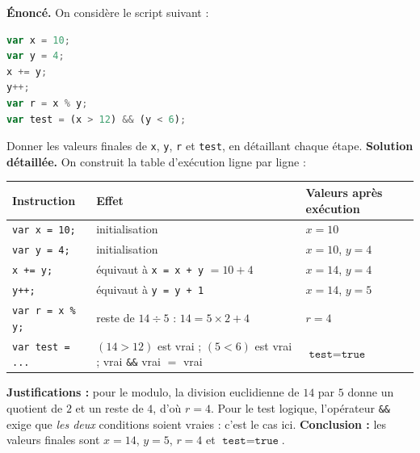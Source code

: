 \documentclass[11pt]{article}
\begin{document}
\begin{exoresolu}
\textbf{Énoncé.} On considère le script suivant :
\begin{lstlisting}[language=JavaScript]
var x = 10;
var y = 4;
x += y;
y++;
var r = x % y;
var test = (x > 12) && (y < 6);
\end{lstlisting}
Donner les valeurs finales de \texttt{x}, \texttt{y}, \texttt{r} et \texttt{test}, en détaillant chaque étape.
\tcblower
\textbf{Solution détaillée.} On construit la table d'exécution ligne par ligne :
\begin{center}
\begin{tabularx}{\linewidth}{|l|X|X|}\hline
\rowcolor{popblueL} \textbf{Instruction} & \textbf{Effet} & \textbf{Valeurs après exécution} \\ \hline
\texttt{var x = 10;} & initialisation & $x = 10$ \\ \hline
\texttt{var y = 4;} & initialisation & $x = 10$, $y = 4$ \\ \hline
\texttt{x += y;} & équivaut à \texttt{x = x + y} $= 10 + 4$ & $x = 14$, $y = 4$ \\ \hline
\texttt{y++;} & équivaut à \texttt{y = y + 1} & $x = 14$, $y = 5$ \\ \hline
\texttt{var r = x \% y;} & reste de $14 \div 5$ : $14 = 5 \times 2 + 4$ & $r = 4$ \\ \hline
\texttt{var test = ...} & $(14 > 12)$ est vrai ; $(5 < 6)$ est vrai ; vrai \texttt{\&\&} vrai $=$ vrai & $\texttt{test} = \texttt{true}$ \\ \hline
\end{tabularx}
\end{center}
\textbf{Justifications :} pour le modulo, la division euclidienne de $14$ par $5$ donne un quotient de $2$ et un reste de $4$, d'où $r = 4$. Pour le test logique, l'opérateur \texttt{\&\&} exige que \emph{les deux} conditions soient vraies : c'est le cas ici.
\textbf{Conclusion :} les valeurs finales sont $x = 14$, $y = 5$, $r = 4$ et $\texttt{test} = \texttt{true}$.
\end{exoresolu}
\end{document}

